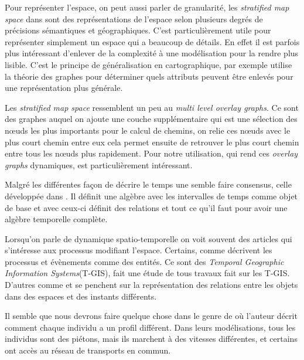 \documentclass[a4paper]{article}
\newcommand{\comment}[1]{}
\begin{document}
Pour représenter l'espace, on peut aussi parler de granularité, \comment{Pas
esthétique il faudrait changer} les \emph{stratified map space} dans
\cite{stell1998} sont des représentations de l'espace selon plusieurs degrés de
précisions sémantiques et géographiques. C'est particulièrement utile pour
représenter simplement un espace qui a beaucoup de détails. En effet il est
parfois plus intéressant d'enlever de la complexité à une modélisation pour la
rendre plus lisible. C'est le principe de généralisation en cartographique, par
exemple \cite{mackaness1993} utilise la théorie des graphes pour déterminer
quels attributs peuvent être enlevés pour une représentation plus générale.

Les \emph{stratified map space} ressemblent un peu au \emph{multi level overlay
graphs}\cite{holzer2009}. Ce sont des graphes auquel on ajoute une couche
supplémentaire qui est une sélection des nœuds les plus importants pour le
calcul de chemins, on relie ces nœuds avec le plus court chemin entre eux cela
permet ensuite de retrouver le plus court chemin entre tous les nœuds plus
rapidement. Pour notre utilisation, \cite{bruera2008} qui rend ces \emph{overlay
graphs} dynamiques, est particulièrement intéressant.

Malgré les différentes façon de décrire le temps une semble faire consensus,
celle développée dans \cite{allen1985}. Il définit une algèbre avec les
intervalles de temps comme objet de base et avec ceux-ci définit des relations
et tout ce qu'il faut pour avoir une algèbre temporelle complète.

Lorsqu'on parle de dynamique spatio-temporelle on voit souvent des articles qui
s'intéresse aux processus modifiant l'espace. Certains, comme
\cite{claramunt1995} décrivent les processus et évènements comme des entités.
Ce sont des \emph{Temporal Geographic Information Systems}(T-GIS),
\cite{siabato2018} fait une étude de tous travaux fait sur les T-GIS. D'autres
comme \cite{delmondo2011} et \cite{costes2015} se penchent sur la représentation
des relations entre les objets dans des espaces et des instants différents.

Il semble que nous devrons faire quelque chose dans le genre de
\cite{jguirim2015} où l'auteur décrit comment chaque individu a un profil
différent. Dans leurs modélisations, tous les individus sont des piétons, mais
ils marchent à des vitesses différentes, et certains ont accès au réseau de
transports en commun.
\end{document}
